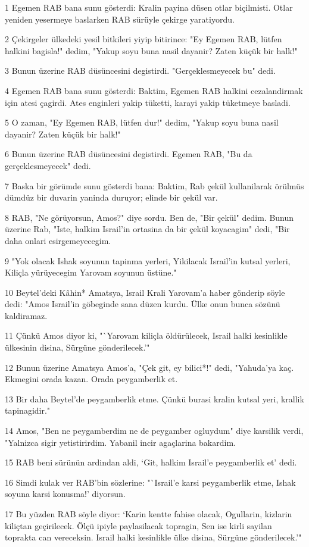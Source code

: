 \par 1 Egemen RAB bana sunu gösterdi: Kralin payina düsen otlar biçilmisti. Otlar yeniden yesermeye baslarken RAB sürüyle çekirge yaratiyordu.
\par 2 Çekirgeler ülkedeki yesil bitkileri yiyip bitirince: "Ey Egemen RAB, lütfen halkini bagisla!" dedim, "Yakup soyu buna nasil dayanir? Zaten küçük bir halk!"
\par 3 Bunun üzerine RAB düsüncesini degistirdi. "Gerçeklesmeyecek bu" dedi.
\par 4 Egemen RAB bana sunu gösterdi: Baktim, Egemen RAB halkini cezalandirmak için atesi çagirdi. Ates enginleri yakip tüketti, karayi yakip tüketmeye basladi.
\par 5 O zaman, "Ey Egemen RAB, lütfen dur!" dedim, "Yakup soyu buna nasil dayanir? Zaten küçük bir halk!"
\par 6 Bunun üzerine RAB düsüncesini degistirdi. Egemen RAB, "Bu da gerçeklesmeyecek" dedi.
\par 7 Baska bir görümde sunu gösterdi bana: Baktim, Rab çekül kullanilarak örülmüs dümdüz bir duvarin yaninda duruyor; elinde bir çekül var.
\par 8 RAB, "Ne görüyorsun, Amos?" diye sordu. Ben de, "Bir çekül" dedim. Bunun üzerine Rab, "Iste, halkim Israil'in ortasina da bir çekül koyacagim" dedi, "Bir daha onlari esirgemeyecegim.
\par 9 "Yok olacak Ishak soyunun tapinma yerleri, Yikilacak Israil'in kutsal yerleri, Kiliçla yürüyecegim Yarovam soyunun üstüne."
\par 10 Beytel'deki Kâhin* Amatsya, Israil Krali Yarovam'a haber gönderip söyle dedi: "Amos Israil'in göbeginde sana düzen kurdu. Ülke onun bunca sözünü kaldiramaz.
\par 11 Çünkü Amos diyor ki, "`Yarovam kiliçla öldürülecek, Israil halki kesinlikle ülkesinin disina, Sürgüne gönderilecek.'"
\par 12 Bunun üzerine Amatsya Amos'a, "Çek git, ey bilici*!" dedi, "Yahuda'ya kaç. Ekmegini orada kazan. Orada peygamberlik et.
\par 13 Bir daha Beytel'de peygamberlik etme. Çünkü burasi kralin kutsal yeri, krallik tapinagidir."
\par 14 Amos, "Ben ne peygamberdim ne de peygamber ogluydum" diye karsilik verdi, "Yalnizca sigir yetistirirdim. Yabanil incir agaçlarina bakardim.
\par 15 RAB beni sürünün ardindan aldi, `Git, halkim Israil'e peygamberlik et' dedi.
\par 16 Simdi kulak ver RAB'bin sözlerine: "`Israil'e karsi peygamberlik etme, Ishak soyuna karsi konusma!' diyorsun.
\par 17 Bu yüzden RAB söyle diyor: `Karin kentte fahise olacak, Ogullarin, kizlarin kiliçtan geçirilecek. Ölçü ipiyle paylasilacak topragin, Sen ise kirli sayilan toprakta can vereceksin. Israil halki kesinlikle ülke disina, Sürgüne gönderilecek.'"

